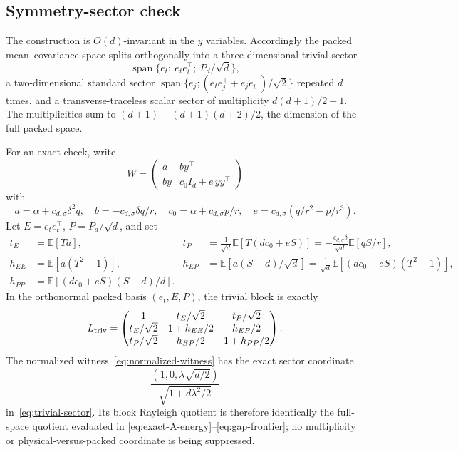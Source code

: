 \documentclass[11pt]{article}
\numberwithin{equation}{section}
\newcommand{\E}{\mathbb E}
\begin{document}
\subsection{Symmetry-sector check}

The construction is $O(d)$-invariant in the $y$ variables.  Accordingly the
packed mean--covariance space splits orthogonally into a three-dimensional
trivial sector
\[
 \operatorname{span}\{e_t;\ e_te_t^\top;\ P_d/\sqrt d\},
\]
a two-dimensional standard sector
$\operatorname{span}\{e_j;(e_te_j^\top+e_je_t^\top)/\sqrt2\}$ repeated $d$
times, and a transverse-traceless scalar sector of multiplicity
$d(d+1)/2-1$.  The multiplicities sum to
$(d+1)+(d+1)(d+2)/2$, the dimension of the full packed space.

For an exact check, write
\[
 W=\begin{pmatrix}a&b y^\top\\b y&c_0I_d+e\,yy^\top\end{pmatrix}
\]
with
\[
 a=\alpha+c_{d,\sigma}\delta^2q,\quad
 b=-c_{d,\sigma}\delta q/r,\quad
 c_0=\alpha+c_{d,\sigma}p/r,\quad
 e=c_{d,\sigma}(q/r^2-p/r^3).
\]
Let $E=e_te_t^\top$, $P=P_d/\sqrt d$, and set
\begin{align*}
 t_E&=\E[Ta],&
 t_P&=\frac1{\sqrt d}\E[T(dc_0+eS)]
 =-\frac{c_{d,\sigma}\delta}{\sqrt d}\E[qS/r],\\
 h_{EE}&=\E[a(T^2-1)],&
 h_{EP}&=\E[a(S-d)/\sqrt d]
 =\frac1{\sqrt d}\E[(dc_0+eS)(T^2-1)],\\
 h_{PP}&=\E[(dc_0+eS)(S-d)/d].
\end{align*}
In the orthonormal packed basis $(e_t,E,P)$, the trivial block is exactly
\begin{equation}\label{eq:trivial-sector}
 L_{\rm triv}=
 \begin{pmatrix}
 1&t_E/\sqrt2&t_P/\sqrt2\\
 t_E/\sqrt2&1+h_{EE}/2&h_{EP}/2\\
 t_P/\sqrt2&h_{EP}/2&1+h_{PP}/2
 \end{pmatrix}.
\end{equation}
The normalized witness~\eqref{eq:normalized-witness} has the exact sector
coordinate
\begin{equation}\label{eq:witness-sector-coordinate}
 \frac{(1,0,\lambda\sqrt{d/2})}
 {\sqrt{1+d\lambda^2/2}}
\end{equation}
in~\eqref{eq:trivial-sector}.  Its block Rayleigh quotient is therefore
identically the full-space quotient evaluated in
\eqref{eq:exact-A-energy}--\eqref{eq:gap-frontier}; no multiplicity or
physical-versus-packed coordinate is being suppressed.
\end{document}
